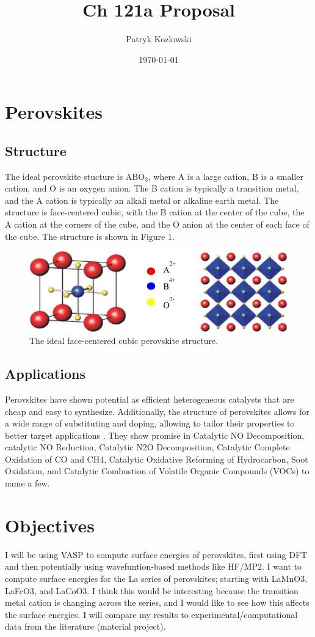 \documentclass{article}
\title{Ch 121a Proposal}
\author{Patryk Kozlowski}
\date{\today}
\begin{document}
\section{Perovskites}
\subsection{Structure}
The ideal perovskite stucture is ABO$_3$, where A is a large cation, B is a smaller cation, and O is an oxygen anion. The B cation is typically a transition metal, and the A cation is typically an alkali metal or alkaline earth metal. The structure is face-centered cubic, with the B cation at the center of the cube, the A cation at the corners of the cube, and the O anion at the center of each face of the cube. The structure is shown in Figure 1.
\begin{figure}
\includegraphics[width=\linewidth]{perovskite.png}
\caption{The ideal face-centered cubic perovskite structure. \cite{assirey2019perovskite}}
\label{fig:perovskite}
\end{figure}
\subsection{Applications}
Perovskites have shown potential as efficient heterogeneous catalysts that are cheap and easy to synthesize. Additionally, the structure of perovskites allows for a wide range of substituting and doping, allowing to tailor their properties to better target applications \cite{royer2014perovskites}. They show promise in Catalytic NO Decomposition, catalytic NO Reduction, Catalytic N2O Decomposition, Catalytic Complete Oxidation of CO and CH4, Catalytic Oxidative Reforming of Hydrocarbon, Soot Oxidation, and Catalytic Combustion of Volatile Organic Compounds (VOCs) to name a few. \cite{zhu2014perovskite}
\section{Objectives}
I will be using VASP to compute surface energies of perovskites, first using DFT and then  potentially using wavefuntion-based methods like HF/MP2. I want to compute surface energies for the La series of perovskites; starting with LaMnO3, LaFeO3, and LaCoO3. I think this would be interesting because the transition metal cation is changing across the series, and I would like to see how this affects the surface energies. I will compare my results to experimental/computational data from the literature (material project).
\end{document}
